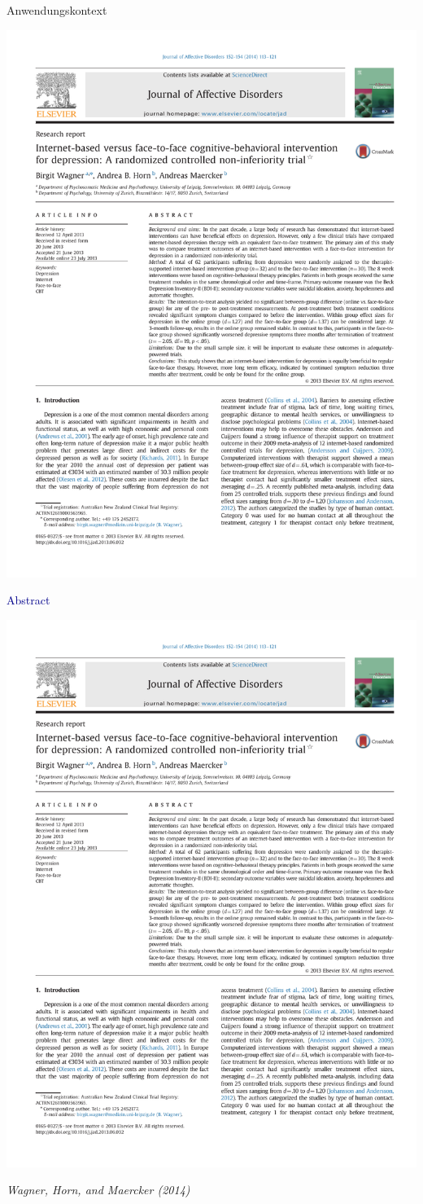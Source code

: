 \documentclass[
  8pt,
  ignorenonframetext,
]{beamer}
\begin{document}
\begin{frame}[t]{Anwendungskontext}
\protect\hypertarget{anwendungskontext-6}{}
\begin{center}\includegraphics[width=0.5\linewidth]{8_Abbildungen/alm_8_article_title} \end{center}
\center

\textcolor{darkblue}{Abstract}

\begin{center}\includegraphics[width=0.7\linewidth]{8_Abbildungen/alm_8_article_abstract} \end{center}
\flushright
\footnotesize

\emph{Wagner, Horn, and Maercker (2014)}
\end{frame}
\end{document}
